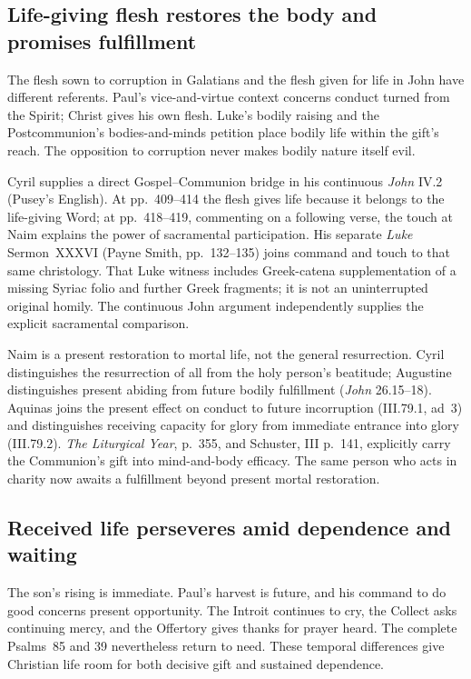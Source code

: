\subsection*{Life-giving flesh restores the body and promises fulfillment\enspace{}}

The flesh sown to corruption in Galatians and the flesh given for life in
John have different referents. Paul's vice-and-virtue context concerns
conduct turned from the Spirit; Christ gives his own flesh. Luke's bodily
raising and the Postcommunion's bodies-and-minds petition place bodily life
within the gift's reach. The opposition to corruption never makes bodily
nature itself evil.

Cyril supplies a direct Gospel--Communion bridge in his continuous
\emph{John} IV.2 (Pusey's English). At pp.~409--414 the flesh gives
life because it belongs to the life-giving Word; at pp.~418--419,
commenting on a following verse, the touch at Naim explains the power of
sacramental participation. His separate \emph{Luke} Sermon~XXXVI
(Payne Smith, pp.~132--135) joins command and touch to that same
christology. That Luke witness includes Greek-catena supplementation of a
missing Syriac folio and further Greek fragments; it is not an uninterrupted
original homily. The continuous John argument independently supplies the
explicit sacramental comparison.

Naim is a present restoration to mortal life, not the general resurrection.
Cyril distinguishes the resurrection of all from the holy person's
beatitude; Augustine distinguishes present abiding from future bodily
fulfillment (\emph{John} 26.15--18). Aquinas joins the present effect on
conduct to future incorruption (III.79.1, ad~3) and distinguishes receiving
capacity for glory from immediate entrance into glory (III.79.2).
\emph{The Liturgical Year}, p.~355, and Schuster, III p.~141,
explicitly carry the Communion's gift into mind-and-body efficacy.
The same person who acts in charity now awaits a fulfillment beyond
present mortal restoration.

\subsection*{Received life perseveres amid dependence and waiting\enspace{}}

The son's rising is immediate. Paul's harvest is future, and his command
to do good concerns present opportunity. The Introit continues to cry,
the Collect asks continuing mercy, and the Offertory gives thanks for
prayer heard. The complete Psalms~85 and 39 nevertheless return to need.
These temporal differences give Christian life room for both decisive
gift and sustained dependence.

